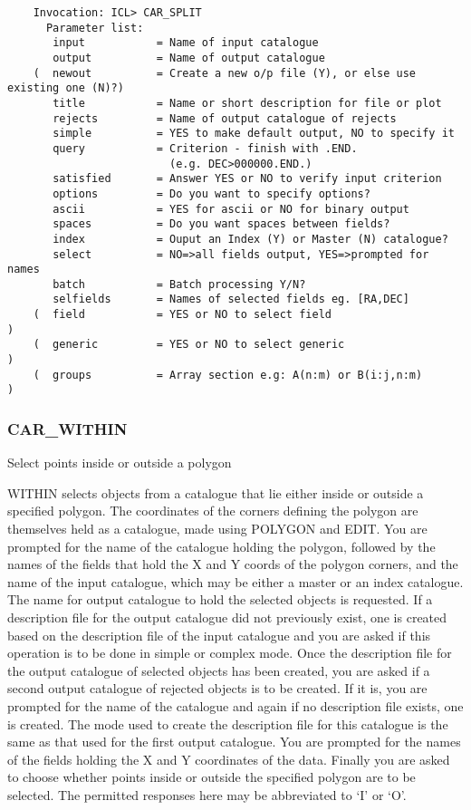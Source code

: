 \begin{verbatim}
    Invocation: ICL> CAR_SPLIT
      Parameter list:
       input           = Name of input catalogue
       output          = Name of output catalogue
    (  newout          = Create a new o/p file (Y), or else use existing one (N)?)
       title           = Name or short description for file or plot
       rejects         = Name of output catalogue of rejects
       simple          = YES to make default output, NO to specify it
       query           = Criterion - finish with .END.
                         (e.g. DEC>000000.END.)
       satisfied       = Answer YES or NO to verify input criterion
       options         = Do you want to specify options?
       ascii           = YES for ascii or NO for binary output
       spaces          = Do you want spaces between fields?
       index           = Ouput an Index (Y) or Master (N) catalogue?
       select          = NO=>all fields output, YES=>prompted for names
       batch           = Batch processing Y/N?
       selfields       = Names of selected fields eg. [RA,DEC]
    (  field           = YES or NO to select field                               )
    (  generic         = YES or NO to select generic                             )
    (  groups          = Array section e.g: A(n:m) or B(i:j,n:m)                 )
\end{verbatim}

\subsubsection{CAR\_WITHIN}

Select points inside or outside a polygon

WITHIN selects objects from a catalogue that lie either inside or outside 
a specified polygon. 
The coordinates of the corners defining the polygon are themselves held as 
a catalogue, made using POLYGON and EDIT.
You are prompted for the name of the catalogue holding the polygon, 
followed by the names of the fields that hold the X and Y coords of the 
polygon corners, and the name of the input catalogue, which may be either 
a master or an index catalogue. 
The name for output catalogue to hold the selected objects is requested. 
If a description file for the output catalogue did not previously exist, one 
is created based on the description file of the input catalogue and you are
asked if this operation is to be done in simple or complex mode.
Once the description file for the output catalogue of selected objects has 
been created, you are asked if a second output catalogue of rejected 
objects is to be created. 
If it is, you are prompted for the name of the catalogue and again if 
no description file exists, one is created. 
The mode used to create the description file for this catalogue is the same 
as that used for the first output catalogue.
You are prompted for the names of the fields holding the X and Y 
coordinates of the data. 
Finally you are asked to choose whether points inside or outside the 
specified polygon are to be selected. 
The permitted responses here may be abbreviated to `I' or `O'.

